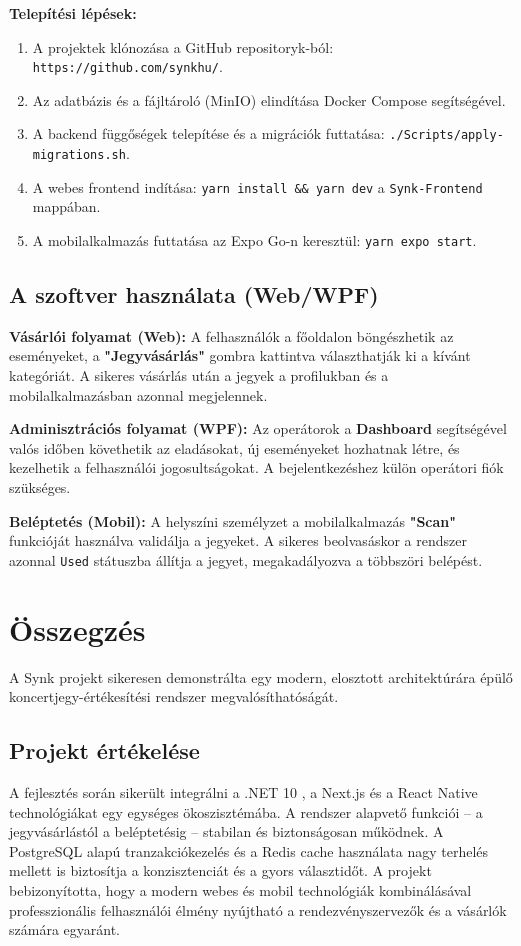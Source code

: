 \documentclass[colorlinks]{docs}
\theoremstyle{definition}
\theoremstyle{remark}
\begin{document}
\textbf{Telepítési lépések:}
\begin{enumerate}
    \item A projektek klónozása a GitHub repositoryk-ból: \texttt{https://github.com/synkhu/}.
    \item Az adatbázis és a fájltároló (MinIO) elindítása Docker Compose segítségével.
    \item A backend függőségek telepítése és a migrációk futtatása: \texttt{./Scripts/apply-migrations.sh}.
    \item A webes frontend indítása: \texttt{yarn install \&\& yarn dev} a \texttt{Synk-Frontend} mappában.
    \item A mobilalkalmazás futtatása az Expo Go-n keresztül: \texttt{yarn expo start}.
\end{enumerate}

\section{A szoftver használata (Web/WPF)}
\textbf{Vásárlói folyamat (Web):}
A felhasználók a főoldalon böngészhetik az eseményeket, a \textbf{"Jegyvásárlás"} gombra kattintva választhatják ki a kívánt kategóriát. A sikeres vásárlás után a jegyek a profilukban és a mobilalkalmazásban azonnal megjelennek.

\textbf{Adminisztrációs folyamat (WPF):}
Az operátorok a \textbf{Dashboard} segítségével valós időben követhetik az eladásokat, új eseményeket hozhatnak létre, és kezelhetik a felhasználói jogosultságokat. A bejelentkezéshez külön operátori fiók szükséges.

\textbf{Beléptetés (Mobil):}
A helyszíni személyzet a mobilalkalmazás \textbf{"Scan"} funkcióját használva validálja a jegyeket. A sikeres beolvasáskor a rendszer azonnal \texttt{Used} státuszba állítja a jegyet, megakadályozva a többszöri belépést.

\chapter{Összegzés}
A Synk projekt sikeresen demonstrálta egy modern, elosztott architektúrára épülő koncertjegy-értékesítési rendszer megvalósíthatóságát.

\section{Projekt értékelése}
A fejlesztés során sikerült integrálni a .NET 10 \cite{dotnet10}, a Next.js \cite{nextjs} és a React Native \cite{reactnative} technológiákat egy egységes ökoszisztémába. A rendszer alapvető funkciói – a jegyvásárlástól a beléptetésig – stabilan és biztonságosan működnek. A PostgreSQL \cite{postgresql} alapú tranzakciókezelés és a Redis cache használata nagy terhelés mellett is biztosítja a konzisztenciát és a gyors választidőt. A projekt bebizonyította, hogy a modern webes és mobil technológiák kombinálásával professzionális felhasználói élmény nyújtható a rendezvényszervezők és a vásárlók számára egyaránt.
\end{document}
